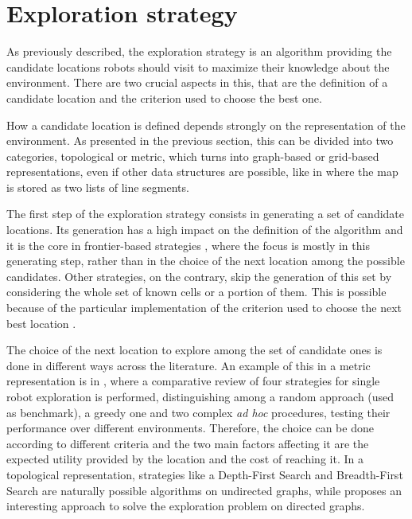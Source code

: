 \section{Exploration strategy}

As previously described, the exploration strategy is an algorithm
providing the candidate locations robots should visit to maximize
their knowledge about the environment. There are two crucial aspects
in this, that are the definition of a candidate location and the criterion
used to choose the best one. 

How a candidate location is defined depends strongly on the representation
of the environment. As presented in the previous section, this can
be divided into two categories, topological or metric, which turns
into graph-based or grid-based representations, even if other data
structures are possible, like in \cite{Amigoni2008} where the map is stored
as two lists of line segments. 

The first step of the exploration strategy consists in generating
a set of candidate locations. Its generation has a high impact on
the definition of the algorithm and it is the core in frontier-based
strategies \cite{Yamauchi,Yamauchi1998,Wang2014,Gomez2019},
where the focus is mostly in this generating step, rather than in
the choice of the next location among the possible candidates. Other
strategies, on the contrary, skip the generation of this set by considering
the whole set of known cells or a portion of them. This is possible
because of the particular implementation of the criterion used to
choose the next best location \cite{Stachniss2009}.

The choice of the next location to explore among the set of candidate
ones is done in different ways across the literature. An example of
this in a metric representation is in \cite{Amigoni2008}, where a comparative
review of four strategies for single robot exploration is performed,
distinguishing among a random approach (used as benchmark), a greedy
one and two complex \emph{ad hoc} procedures, testing their performance
over different environments. Therefore, the choice can be done according
to different criteria and the two main factors affecting it are the
expected utility provided by the location and the cost of reaching
it. In a topological representation, strategies like a Depth-First
Search \cite{Dessmark2002} and Breadth-First Search \cite{Wang2008} are naturally
possible algorithms on undirected graphs, while \cite{Albers2000} proposes
an interesting approach to solve the exploration problem on directed
graphs.

